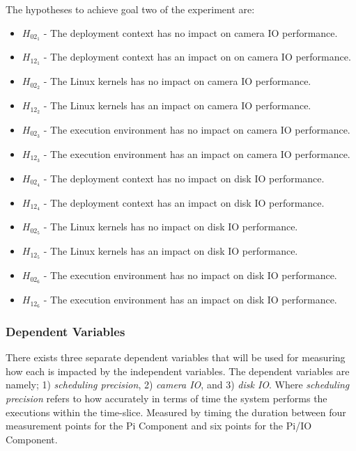 The hypotheses to achieve goal two of the experiment are:
\begin{itemize}
\item $H_{02_{1}}$ - The deployment context has no impact on camera IO performance.
\item $H_{12_{1}}$ - The deployment context has an impact on on camera IO performance.
\item $H_{02_{2}}$ - The Linux kernels has no impact on camera IO performance.
\item $H_{12_{2}}$ - The Linux kernels has an impact on camera IO performance.
\item $H_{02_{3}}$ - The execution environment has no impact on camera IO performance.
\item $H_{12_{3}}$ - The execution environment has an impact on camera IO performance.
\item $H_{02_{4}}$ - The deployment context has no impact on disk IO performance.
\item $H_{12_{4}}$ - The deployment context has an impact on disk IO performance.
\item $H_{02_{5}}$ - The Linux kernels has no impact on disk IO performance.
\item $H_{12_{5}}$ - The Linux kernels has an impact on disk IO performance.
\item $H_{02_{6}}$ - The execution environment has no impact on disk IO performance.
\item $H_{12_{6}}$ - The execution environment has an impact on disk IO performance.
\end{itemize}


\subsubsection{Dependent Variables}
There exists three separate dependent variables that will be used for measuring how each is impacted by the independent variables. The dependent variables are namely; 1) \textit{scheduling precision}, 2) \textit{camera IO}, and 3) \textit{disk IO}. Where \textit{scheduling precision} refers to how accurately in terms of time the system performs the executions within the time-slice. Measured by timing the duration between four measurement points for the Pi Component and six points for the Pi/IO Component.\\ 

